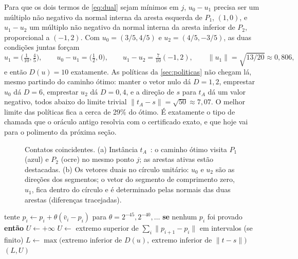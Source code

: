 \documentclass[11pt,a4paper]{article}
\theoremstyle{plain}\newtheorem{proposicao}{Proposição}
\theoremstyle{definition}\newtheorem{definicao}{Definição}
\theoremstyle{plain}\newtheorem{teorema}{Teorema}
\newcommand{\norm}[1]{\lVert#1\rVert}
\begin{document}
Para que os dois termos de \eqref{eq:dual} sejam mínimos em \(j\), \(u_0-u_1\) precisa ser um múltiplo não negativo da normal interna da aresta esquerda de \(P_1\), \((1,0)\), e \(u_1-u_2\) um múltiplo não negativo da normal interna da aresta inferior de \(P_2\), proporcional a \((-1,2)\). Com \(u_0=(3/5,4/5)\) e \(u_2=(4/5,-3/5)\), as duas condições juntas forçam
\[
u_1=\bigl(\tfrac1{10},\tfrac45\bigr),\qquad u_0-u_1=\bigl(\tfrac12,0\bigr),\qquad u_1-u_2=\tfrac7{10}(-1,2),\qquad \norm{u_1}=\sqrt{13/20}\approx0{,}806,
\]
e então \(D(u)=10\) exatamente. As políticas da \cref{sec:politicas} não chegam lá, mesmo partindo do caminho ótimo: manter o vetor nulo dá \(D=1{,}2\), emprestar \(u_0\) dá \(D=6\), emprestar \(u_2\) dá \(D=0{,}4\), e a direção de \(s\) para \(t_A\) dá um valor negativo, todos abaixo do limite trivial \(\norm{t_A-s}=\sqrt{50}\approx7{,}07\). O melhor limite das políticas fica a cerca de 29\% do ótimo. É exatamente o tipo de chamada que o oráculo antigo resolvia com o certificado exato, e que hoje vai para o polimento da próxima seção.

\begin{figure}[ht]\centering\figcoincidente
\caption{Contatos coincidentes. (a) Instância \(t_A\)~\cite{contraexemplo}: o caminho ótimo visita \(P_1\) (azul) e \(P_2\) (ocre) no mesmo ponto \(j\); as arestas ativas estão destacadas. (b) Os vetores duais no círculo unitário: \(u_0\) e \(u_2\) são as direções dos segmentos; o vetor do segmento de comprimento zero, \(u_1\), fica dentro do círculo e é determinado pelas normais das duas arestas (diferenças tracejadas).}\label{fig:coincidente}
\end{figure}

\begin{algorithm}[ht]\small
\caption{Prova dos limites para uma proposta (contatos \(p_1,\dots,p_m\) e vetores \(u_0,\dots,u_m\)).}\label{alg:prova}
\begin{algorithmic}[1]
      \State tente $p_i\gets p_i+\theta(\bar v_i-p_i)$ para $\theta=2^{-45},2^{-40},\dots$
      \State \textbf{se} nenhum $p_i$ foi provado \textbf{então} $U\gets+\infty$
    \EndIf
  \EndFor
  \State $U\gets$ extremo superior de $\sum_i\norm{p_{i+1}-p_i}$ em intervalos (se finito)
  \ForOne{$i=0,\dots,m$}{$u_i\gets$ vetor com $\norm{u_i}\le1$ provado}
  \State $L\gets\max\bigl(\text{extremo inferior de }D(u),\ \text{extremo inferior de }\norm{t-s}\bigr)$
  \State \Return $(L,U)$
\EndFunction
\end{algorithmic}
\end{algorithm}
\end{document}
